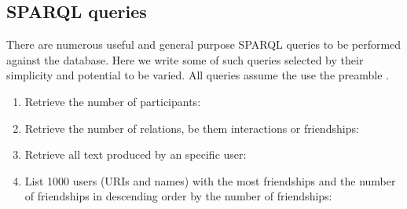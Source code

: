 	\subsection{SPARQL queries}\label{queries}
	There are numerous useful and general purpose SPARQL queries to be performed against the database.
	Here we write some of such queries selected by their simplicity and potential to be varied.
	All queries assume the use the preamble .
	\begin{enumerate}[leftmargin=0cm]
		\item Retrieve the number of participants:\\
			\item Retrieve the number of relations, be them interactions or
				friendships:\\
																														    \item Retrieve all text produced by an specific user:\\
																																				    \item List 1000 users (URIs and names) with the most friendships and the number of
																																					    friendships in descending order by the number of friendships:\\
\end{enumerate}
